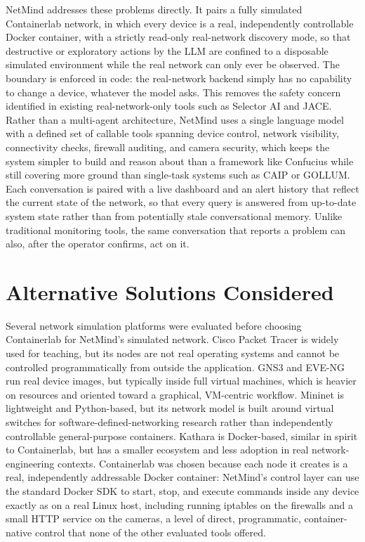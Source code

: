 NetMind addresses these problems directly. It pairs a fully simulated
Containerlab network, in which every device is a real, independently
controllable Docker container, with a strictly read-only real-network
discovery mode, so that destructive or exploratory actions by the LLM are
confined to a disposable simulated environment while the real network can
only ever be observed. The boundary is enforced in code: the real-network
backend simply has no capability to change a device, whatever the model
asks. This removes the safety concern identified in existing
real-network-only tools such as Selector AI and JACE. Rather than a
multi-agent architecture, NetMind uses a single language model with a
defined set of callable tools spanning device control, network visibility,
connectivity checks, firewall auditing, and camera security, which keeps the
system simpler to build and reason about than a framework like Confucius
while still covering more ground than single-task systems such as CAIP or
GOLLUM. Each conversation is paired with a live dashboard and an alert
history that reflect the current state of the network, so that every query
is answered from up-to-date system state rather than from potentially stale
conversational memory. Unlike traditional monitoring tools, the same
conversation that reports a problem can also, after the operator confirms,
act on it.

\section{Alternative Solutions Considered}


Several network simulation platforms were evaluated before choosing
Containerlab for NetMind's simulated network. Cisco Packet Tracer is widely
used for teaching, but its nodes are not real operating systems and cannot be
controlled programmatically from outside the application. GNS3 and EVE-NG run
real device images, but typically inside full virtual machines, which is
heavier on resources and oriented toward a graphical, VM-centric workflow.
Mininet is lightweight and Python-based, but its network model is built
around virtual switches for software-defined-networking research rather than
independently controllable general-purpose containers. Kathara is
Docker-based, similar in spirit to Containerlab, but has a smaller ecosystem
and less adoption in real network-engineering contexts. Containerlab was
chosen because each node it creates is a real, independently addressable
Docker container: NetMind's control layer can use the standard Docker SDK to
start, stop, and execute commands inside any device exactly as on a real
Linux host, including running iptables on the firewalls and a small HTTP
service on the cameras, a level of direct, programmatic, container-native
control that none of the other evaluated tools offered.


